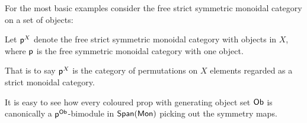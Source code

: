 For the most basic examples consider the free strict symmetric monoidal category on a set of objects:
\begin{definition}
Let $\P^X$ denote the free strict symmetric monoidal category with objects in $X$, where $\P$ is the free symmetric monoidal category with one object.

That is to say $\P^X$ is the category of permutations on $X$ elements regarded as a strict monoidal category.
\end{definition}
%
%
%
%
%
%
%
%
%
%
It is easy to see how every coloured prop with generating object set $\sf Ob$ is canonically a $\P^{\sf Ob}$-bimodule in $\Span(\Mon)$ picking out the symmetry maps.



